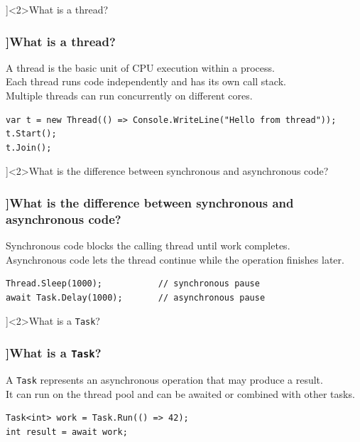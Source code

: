 \QuestionSlide[\CategoryBadge[PerfColor!20]{Async \& Threading}]<2>{What is a thread?}

\begin{frame}[fragile]
  \frametitle{\AnswerTitle[\CategoryBadge[OOPColor!20]{C\#} ]{What is a thread?}}

  {\footnotesize
  A thread is the basic unit of CPU execution within a process.\\
  Each thread runs code independently and has its own call stack.\\
  Multiple threads can run concurrently on different cores.
  }

  \begin{verbatim}
var t = new Thread(() => Console.WriteLine("Hello from thread"));
t.Start();
t.Join();
  \end{verbatim}
\end{frame}

\QuestionSlide[\CategoryBadge[PerfColor!20]{Async \& Threading}]<2>{What is the difference between synchronous and asynchronous code?}

\begin{frame}[fragile]
  \frametitle{\AnswerTitle[\CategoryBadge[OOPColor!20]{C\#} ]{What is the difference between synchronous and asynchronous code?}}

  {\footnotesize
  Synchronous code blocks the calling thread until work completes.\\
  Asynchronous code lets the thread continue while the operation finishes later.
  }

  \begin{verbatim}
Thread.Sleep(1000);           // synchronous pause
await Task.Delay(1000);       // asynchronous pause
  \end{verbatim}
\end{frame}

\QuestionSlide[\CategoryBadge[PerfColor!20]{Async \& Threading}]<2>{What is a \texttt{Task}?}

\begin{frame}[fragile]
  \frametitle{\AnswerTitle[\CategoryBadge[OOPColor!20]{C\#} ]{What is a \texttt{Task}?}}

  {\footnotesize
  A \texttt{Task} represents an asynchronous operation that may produce a result.\\
  It can run on the thread pool and can be awaited or combined with other tasks.
  }

  \begin{verbatim}
Task<int> work = Task.Run(() => 42);
int result = await work;
  \end{verbatim}
\end{frame}

